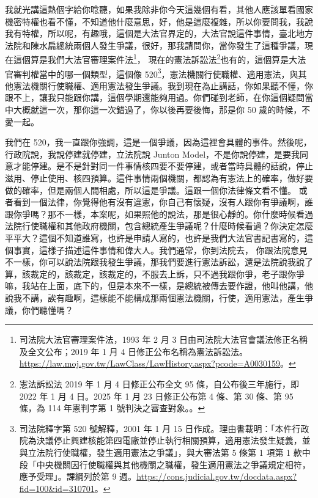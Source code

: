\hypertarget{c11:cue:32}{}我就光講這熱個字給你唸聽，如果我除非你今天這幾個有看，其他人應該單看國家機密特權也看不懂，不知道他什麼意思，好，他是這麼複雜，所以你要問我，我說我有特權，所以呢，有趣哦，這個是大法官界定的，大法官說這件事情，臺北地方法院和陳水扁總統兩個人發生爭議，很好，那我請問你，當你發生了這種爭議，現在這個算是我們大法官審理案件法\footnote{司法院大法官審理案件法，1993 年 2 月 3 日由司法院大法官會議法修正名稱及全文公布；2019 年 1 月 4 日修正公布名稱為憲法訴訟法。\url{https://law.moj.gov.tw/LawClass/LawHistory.aspx?pcode=A0030159}。}，
\hypertarget{c11:cue:33}{}現在的憲法訴訟法\footnote{憲法訴訟法 2019 年 1 月 4 日修正公布全文 95 條，自公布後三年施行，即 2022 年 1 月 4 日。2025 年 1 月 23 日修正公布第 4 條、第 30 條、第 95 條，為 114 年憲判字第 1 號判決之審查對象。\cite{csfa}。}也有的，這個算是大法官審判權當中的哪一個類型，這個像 520\footnote{司法院釋字第 520 號解釋，2001 年 1 月 15 日作成。理由書載明：「本件行政院為決議停止興建核能第四電廠並停止執行相關預算，適用憲法發生疑義，並與立法院行使職權，發生適用憲法之爭議」，與大審法第 5 條第 1 項第 1 款中段「中央機關因行使職權與其他機關之職權，發生適用憲法之爭議規定相符，應予受理」。課綱列於第 9 週。\url{https://cons.judicial.gov.tw/docdata.aspx?fid=100&id=310701}。}，憲法機關行使職權、適用憲法，與其他憲法機關行使職權、適用憲法發生爭議。我到現在為止講話，你如果聽不懂，你跟不上，讓我只能跟你講，這個學期還能夠用過。你們碰到老師，在你這個疑問當中大概就這一次，那你這一次錯過了，你以後再要後悔，那是你 50 歲的時候，不愛一起。

\hypertarget{c11:cue:34}{}我們在 520，我一直跟你強調，這是一個爭議，因為這裡會具體的事件。然後呢，行政院說，我說停建就停建，立法院說 Junton Model，不是你說停建，是要我同意才能停建。是不是針對同一件事情核四要不要停建，或者當時具體的話說，停止滋用、停止使用、核四預算。這件事情兩個機關，都認為有憲法上的確率，做好要做的確率，但是兩個人間相處，所以這是爭議。這跟一個你法律條文看不懂。
\hypertarget{c11:cue:35}{}或者看到一個法律，你覺得他有沒有違憲，你自己有懷疑，沒有人跟你有爭議啊，誰跟你爭嗎？那不一樣，本案呢，如果照他的說法，那是很心靜的。你什麼時候看過法院行使職權和其他政府機關，包含總統產生爭議呢？什麼時候看過？你決定怎麼平平大？這個不知道誰寫，也許是申請人寫的，也許是我們大法官書記書寫的，這個事實，這樣子描述這件事情和偉大人。我們通常，你到法院去，
\hypertarget{c11:cue:36}{}你跟法院意見不一樣，你可以說法院跟我發生爭議，那我們要進行憲法訴訟，還是法院說我說了算，該裁定的，該裁定，該裁定的，不服去上訴，只不過我跟你爭，老子跟你爭嘛，我站在上面，底下的，但是本來不一樣，是總統被傳去要作證，他叫他講，他說我不講，誒有趣啊，這樣能不能構成那兩個憲法機關，行使，適用憲法，產生爭議，你們聽懂嗎？

